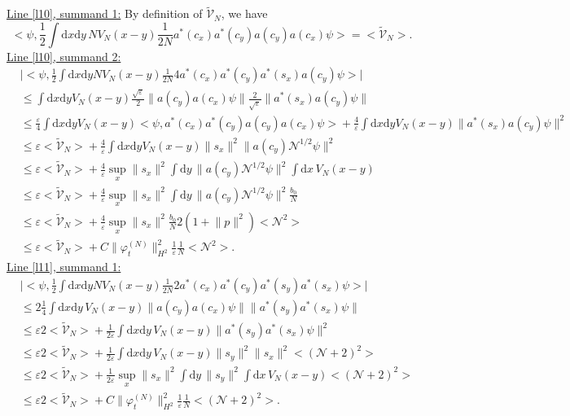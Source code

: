 \documentclass[11pt,a4paper,draft,DIV11]{scrartcl}	%
\newcommand{\di}{\textrm{d}}		%
\newcommand{\Ncal}{\mathcal{N}}		%
\newcommand{\tilV}{\tilde{\mathcal{V}}_N}		%
\newcommand{\estlist}[2]{\underline{Line \ref{l#1}, summand #2:}}
\newcommand{\scal}[2]{\big<#1,#2\big>} %
\newcommand{\norm}[1]{\lVert#1\rVert}	%
\newcommand{\ev}[1]{\big<#1\big>}	%
\newcommand{\ph}{\varphi_t^{(N)}}	%
\newcommand{\dxyNV}{\frac{1}{2}\int \di x\di y N V_N(x-y)} %
\newcommand{\bd}{\begin{displaymath}}			%
\newcommand{\ed}{\end{displaymath}}
\begin{document}
\estlist{10}{1}
By definition of $\tilV$, we have
\bd
\scal{\psi}{\frac{1}{2}\int \di x\di y\, NV_N(x-y)\frac{1}{2N} a^\ast(c_x) a^\ast(c_y) a(c_y) a(c_x)\psi} = \ev{\tilV}.
\ed
\estlist{10}{2}
\begin{align*}
 & \lvert \scal{\psi}{\dxyNV \frac{1}{2N} 4 a^\ast(c_x)a^\ast(c_y) a^\ast(s_x)a(c_y)\psi}\rvert \\
& \leq \int \di x\di y V_N(x-y) \frac{\sqrt{\varepsilon}}{2} \norm{a(c_y) a(c_x)\psi} \frac{2}{\sqrt{\varepsilon}} \norm{a^\ast(s_x)a(c_y)\psi} \\
& \leq \frac{\varepsilon}{4} \int \di x\di y V_N(x-y) \scal{\psi}{a^\ast(c_x)a^\ast(c_y)a(c_y)a(c_x)\psi} + \frac{4}{\varepsilon} \int \di x\di y V_N(x-y) \norm{a^\ast(s_x)a(c_y)\psi}^2 \\
& \leq \varepsilon \ev{\tilV} + \frac{4}{\varepsilon}\int \di x\di y V_N(x-y) \norm{s_x}^2 \norm{a(c_y)\Ncal^{1/2}\psi}^2 \\
& \leq \varepsilon \ev{\tilV} + \frac{4}{\varepsilon} \sup_x \norm{s_x}^2 \int \di y\, \norm{a(c_y)\Ncal^{1/2}\psi}^2 \int \di x\, V_N(x-y)\\
& \leq \varepsilon \ev{\tilV} + \frac{4}{\varepsilon} \sup_x \norm{s_x}^2 \int \di y\, \norm{a(c_y)\Ncal^{1/2}\psi}^2 \frac{b_0}{N}\\
& \leq \varepsilon \ev{\tilV} + \frac{4}{\varepsilon} \sup_x \norm{s_x}^2 \frac{b_0}{N} 2 (1+\norm{p}^2)\ev{\Ncal^2} \\
& \leq \varepsilon \ev{\tilV} + C\norm{\ph}_{H^2}^2 \frac{1}{\varepsilon} \frac{1}{N}\ev{\Ncal^2}.
\end{align*}
\estlist{11}{1}
\begin{align*}
& \lvert \scal{\psi}{\dxyNV \frac{1}{2N}2a^\ast(c_x)a^\ast(c_y) a^\ast(s_y) a^\ast(s_x) \psi}\rvert \\
& \leq 2\frac{1}{4}\int \di x\di y\, V_N(x-y)  \norm{a(c_y)a(c_x)\psi} \norm{a^\ast(s_y)a^\ast(s_x)\psi} \\
& \leq \varepsilon 2 \ev{\tilV} + \frac{1}{2\varepsilon} \int \di x\di y\, V_N(x-y) \norm{a^\ast(s_y)a^\ast(s_x)\psi}^2 \\
& \leq \varepsilon 2 \ev{\tilV} + \frac{1}{2\varepsilon} \int \di x\di y\, V_N(x-y) \norm{s_y}^2 \norm{s_x}^2 \ev{(\Ncal+2)^2} \\
& \leq \varepsilon 2 \ev{\tilV} + \frac{1}{2\varepsilon} \sup_x \norm{s_x}^2 \int \di y\, \norm{s_y}^2 \int \di x\, V_N(x-y) \ev{(\Ncal+2)^2} \\
& \leq \varepsilon 2\ev{\tilV} + C\norm{\ph}_{H^2}^2 \frac{1}{\varepsilon} \frac{1}{N}\ev{(\Ncal+2)^2}.
\end{align*}
\end{document}
